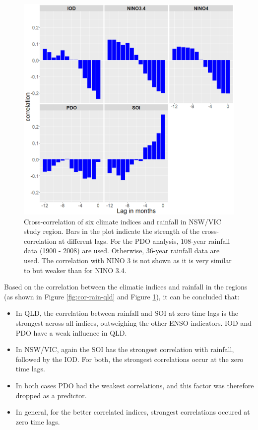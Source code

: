 \documentclass[fleqn,10pt,lineno]{wlpeerj} %
\providecommand{\tightlist}{
\setlength{\itemsep}{0pt}\setlength{\parskip}{0pt}}
\theoremstyle{definition}
\theoremstyle{definition}
\theoremstyle{definition}
\theoremstyle{remark}
\begin{document}
\begin{figure}
\includegraphics[width=0.9\linewidth]{figures/FigS2} \caption{Cross-correlation of six climate indices and rainfall in NSW/VIC study region. Bars in the plot indicate the strength of the cross-correlation at different lags. For the PDO analysis, 108-year rainfall data (1900 - 2008) are used. Otherwise, 36-year rainfall data are used. The correlation with NINO 3 is not shown as it is very similar to but weaker than for NINO 3.4.}\label{fig:cor-rain-nsw}
\end{figure}

Based on the correlation between the climatic indices and rainfall in
the regions (as shown in Figure \ref{fig:cor-rain-qld} and Figure
\ref{fig:cor-rain-nsw}), it can be concluded that:

\begin{itemize}
\tightlist
\item
  In QLD, the correlation between rainfall and SOI at zero time lags is
  the strongest across all indices, outweighing the other ENSO
  indicators. IOD and PDO have a weak influence in QLD.\\
\item
  In NSW/VIC, again the SOI has the strongest correlation with rainfall,
  followed by the IOD. For both, the strongest correlations occur at the
  zero time lags.\\
\item
  In both cases PDO had the weakest correlations, and this factor was
  therefore dropped as a predictor.\\
\item
  In general, for the better correlated indices, strongest correlations
  occured at zero time lags.
\end{itemize}
\end{document}
